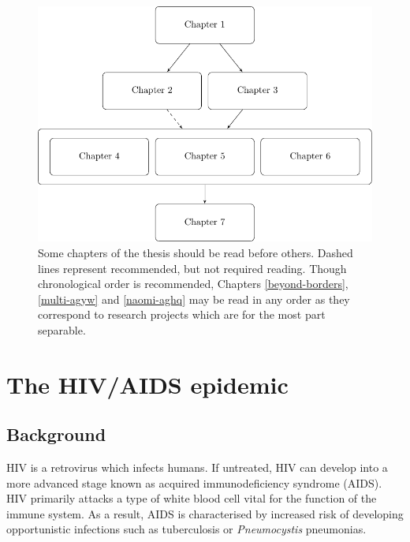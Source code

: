 \documentclass[a4paper, nobind]{templates/ociamthesis}
\begin{document}
\begin{figure}

{\centering \includegraphics[width=0.95\linewidth]{figures/introduction/chapter-flowchart} 

}

\caption{Some chapters of the thesis should be read before others. Dashed lines represent recommended, but not required reading. Though chronological order is recommended, Chapters \ref{beyond-borders}, \ref{multi-agyw} and \ref{naomi-aghq} may be read in any order as they correspond to research projects which are for the most part separable.}\label{fig:chapter-flowchart}
\end{figure}

\hypertarget{hiv-aids}{%
\chapter{The HIV/AIDS epidemic}\label{hiv-aids}}

\adjustmtc
{}

\hypertarget{background}{%
\section{Background}\label{background}}

HIV is a retrovirus which infects humans.
If untreated, HIV can develop into a more advanced stage known as acquired immunodeficiency syndrome (AIDS).
HIV primarily attacks a type of white blood cell vital for the function of the immune system.
As a result, AIDS is characterised by increased risk of developing opportunistic infections such as tuberculosis or \emph{Pneumocystis} pneumonias.
\end{document}
